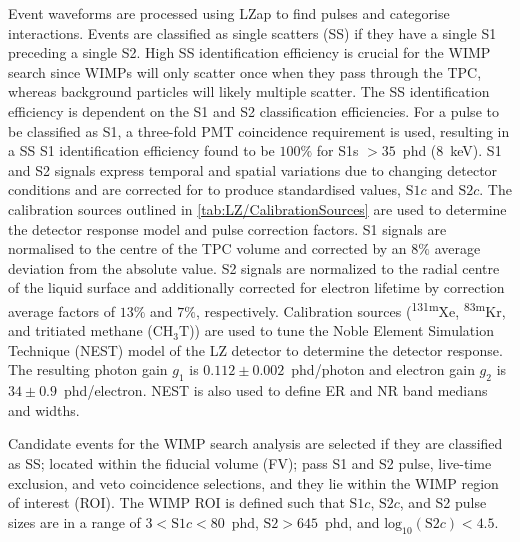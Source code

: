 Event waveforms are processed using LZap to find pulses and categorise interactions. Events are classified as single scatters (SS) if they have a single S1 preceding a single S2. High SS identification efficiency is crucial for the WIMP search since WIMPs will only scatter once when they pass through the TPC, whereas background particles will likely multiple scatter. The SS identification efficiency is dependent on the S1 and S2 classification efficiencies. For a pulse to be classified as S1, a three-fold PMT coincidence requirement is used, resulting in a SS S1 identification efficiency found to be $100\%$ for S1s $>35$~phd (8~keV). S1 and S2 signals express temporal and spatial variations due to changing detector conditions and are corrected for to produce standardised values, $\text{S1}c$ and $\text{S2}c$. The calibration sources outlined in \autoref{tab:LZ/CalibrationSources} are used to determine the detector response model and pulse correction factors. S1 signals are normalised to the centre of the TPC volume and corrected by an $8\%$ average deviation from the absolute value. S2 signals are normalized to the radial centre of the liquid surface and additionally corrected for electron lifetime by correction average factors of $13\%$ and $7\%$, respectively.
Calibration sources (\textsuperscript{131m}Xe, \textsuperscript{83m}Kr, and tritiated methane ($\text{CH}_3\text{T}$)) are used to tune the Noble Element Simulation Technique (NEST) \cite{NEST2011} model of the LZ detector to determine the detector response. The resulting photon gain $g_1$ is $0.112\pm0.002$~phd/photon and electron gain $g_2$ is $34\pm0.9$~phd/electron. NEST is also used to define ER and NR band medians and widths.

Candidate events for the WIMP search analysis are selected if they are classified as SS; located within the fiducial volume (FV); pass S1 and S2 pulse, live-time exclusion, and veto coincidence selections, and they lie within the WIMP region of interest (ROI). The WIMP ROI is defined such that $\text{S1}c$, $\text{S2}c$, and S2 pulse sizes are in a range of $3<\text{S1}c<80$~phd, $\text{S2}>645$~phd, and $\text{log}_\text{10}(\text{S2}c)<4.5$. 

